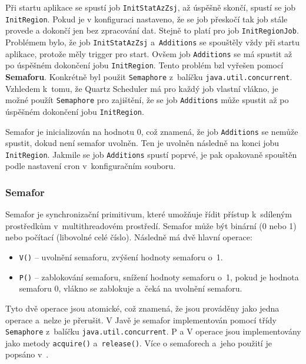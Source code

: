 Při startu aplikace se spustí job \texttt{InitStatAzZsj}, až úspěšně skončí,
spustí se job \texttt{InitRegion}. Pokud je v konfiguraci nastaveno, že se job 
přeskočí tak job stále provede a dokončí jen bez zpracování dat.
Stejně to platí pro job \texttt{InitRegionJob}.
Problémem bylo, že job \texttt{InitStatAzZsj} a~\texttt{Additions} 
se spouštěly vždy při startu aplikace, protože měly trigger pro start. 
Ovšem job \texttt{Additions} se má spustit až po úspěšném dokončení jobu 
\texttt{InitRegion}. Tento problém bzl vyřešen pomocí \textbf{Semaforu}.
Konkrétně byl použit \texttt{Semaphore} z~balíčku \texttt{java.util.concurrent}.
Vzhledem k~tomu, že Quartz Scheduler má pro každý job vlastní vlákno,
je možné použít \texttt{Semaphore} pro zajištění, že se job \texttt{Additions}
může spustit až po úspěšném dokončení jobu \texttt{InitRegion}.

Semafor je inicializován na hodnotu 0, což znamená, že job \texttt{Additions}
se nemůže spustit, dokud není semafor uvolněn. Ten je uvolněn následně na konci 
jobu \texttt{InitRegion}. Jakmile se job \texttt{Additions} spustí poprvé, je pak 
opakovaně spouštěn podle nastavení cron v~konfiguračním souboru.

\subsubsection*{Semafor}
Semafor je synchronizační primitivum, které umožňuje řídit přístup 
k~sdíleným prostředkům v~multithreadovém prostředí.
Semafor může být binární (0 nebo 1) nebo počítací (libovolné celé číslo).
Následně má dvě hlavní operace:
\begin{itemize}
    \item \texttt{V()} -- uvolnění semaforu, zvýšení hodnoty semaforu o~1.
    \item \texttt{P()} -- zablokování semaforu, snížení hodnoty semaforu o~1, pokud je hodnota semaforu 0, vlákno se zablokuje a~čeká na uvolnění semaforu.
\end{itemize}

Tyto dvě operace jsou atomické, což znamená, že jsou prováděny jako jedna operace a~nelze je přerušit.
V Javě je semafor implementován pomocí třídy \texttt{Semaphore} z~balíčku \texttt{java.util.concurrent}.
P a V operace jsou implementovány jako metody \texttt{acquire()} a~\texttt{release()}.
Více o semaforech a~jeho použití je popsáno v~\cite{pesicka_mutexy_monitory}. 


